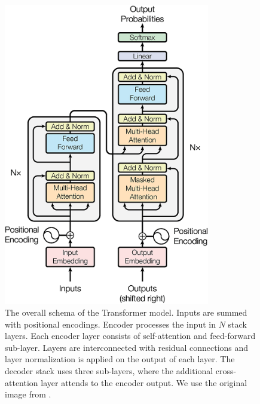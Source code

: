 \begin{figure}
  \centering
  \includegraphics[width=9cm]{img/transformer.png}

  \caption{The overall schema of the Transformer model. Inputs are summed with
    positional encodings. Encoder processes the input in $N$ stack layers. Each
    encoder layer consists of self-attention and feed-forward sub-layer. Layers
    are interconnected with residual connections and layer normalization is
    applied on the output of each layer. The decoder stack uses three
    sub-layers, where the additional cross-attention layer attends to the
    encoder output. We use the original image from
    \citet{vaswani2017attention}.}
  \label{fig:transformer}
\end{figure}

